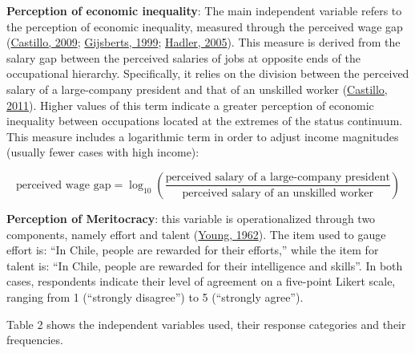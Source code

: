 \documentclass[
  12pt,
]{article}
\begin{document}
\textbf{Perception of economic inequality}: The main independent
variable refers to the perception of economic inequality, measured
through the perceived wage gap
(\protect\hyperlink{ref-castillo_cual_2009}{Castillo, 2009};
\protect\hyperlink{ref-gijsberts_thelegitimation_1999}{Gijsberts, 1999};
\protect\hyperlink{ref-hadler_why_2005}{Hadler, 2005}). This measure is
derived from the salary gap between the perceived salaries of jobs at
opposite ends of the occupational hierarchy. Specifically, it relies on
the division between the perceived salary of a large-company president
and that of an unskilled worker
(\protect\hyperlink{ref-Castillo2011}{Castillo, 2011}). Higher values of
this term indicate a greater perception of economic inequality between
occupations located at the extremes of the status continuum. This
measure includes a logarithmic term in order to adjust income magnitudes
(usually fewer cases with high income):

\[
\text{perceived wage gap} = \log_{10}\left(\frac{\text{perceived salary of a large-company president}}{\text{perceived salary of an unskilled worker}}\right)
\]

\textbf{Perception of Meritocracy}: this variable is operationalized
through two components, namely effort and talent
(\protect\hyperlink{ref-young_rise_1962}{Young, 1962}). The item used to
gauge effort is: ``In Chile, people are rewarded for their efforts,''
while the item for talent is: ``In Chile, people are rewarded for their
intelligence and skills''. In both cases, respondents indicate their
level of agreement on a five-point Likert scale, ranging from 1
(``strongly disagree'') to 5 (``strongly agree'').

Table 2 shows the independent variables used, their response categories
and their frequencies.
\end{document}
